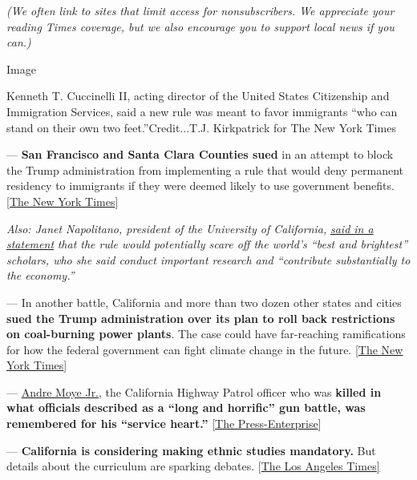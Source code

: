 \emph{(We often link to sites that limit access for nonsubscribers. We
appreciate your reading Times coverage, but we also encourage you to
support local news if you can.)}

Image

Kenneth T. Cuccinelli II, acting director of the United States
Citizenship and Immigration Services, said a new rule was meant to favor
immigrants ``who can stand on their own two feet.''Credit...T.J.
Kirkpatrick for The New York Times

--- \textbf{San Francisco and Santa Clara Counties sued} in an attempt
to block the Trump administration from implementing a rule that would
deny permanent residency to immigrants if they were deemed likely to use
government benefits.
{[}\href{https://www.nytimes3xbfgragh.onion/2019/08/13/us/trump-green-card-lawsuit.html}{The
New York Times}{]}

\emph{Also: Janet Napolitano, president of the University of
California,}
\href{https://www.universityofcalifornia.edu/press-room/uc-statement-final-rule-regarding-public-charge}{\emph{said
in a statement}} \emph{that the rule would potentially scare off the
world's ``best and brightest'' scholars, who she said conduct important
research and ``contribute substantially to the economy.''}

--- In another battle, California and more than two dozen other states
and cities \textbf{sued the Trump administration over its plan to roll
back restrictions on coal-burning power plants}. The case could have
far-reaching ramifications for how the federal government can fight
climate change in the future.
{[}\href{https://www.nytimes3xbfgragh.onion/2019/08/13/climate/states-lawsuit-clean-power-ace.html}{The
New York Times}{]}

---
\href{https://www.pe.com/2019/08/13/slain-riverside-area-chp-officer-andre-moye-jr-remembered-as-very-giving-and-caring-person/}{Andre
Moye Jr.}, the California Highway Patrol officer who was \textbf{killed
in what officials described as a ``long and horrific'' gun battle, was
remembered for his ``service heart.''}
{[}\href{https://www.pe.com/2019/08/13/eastridge-avenue-still-closed-for-investigation-into-fatal-shooting-of-chp-officer/}{The
Press-Enterprise}{]}

--- \textbf{California is considering making ethnic studies mandatory.}
But details about the curriculum are sparking debates.
{[}\href{https://www.latimes.com/california/story/2019-08-12/california-ethnic-studies-curriculum}{The
Los Angeles Times{]}}


